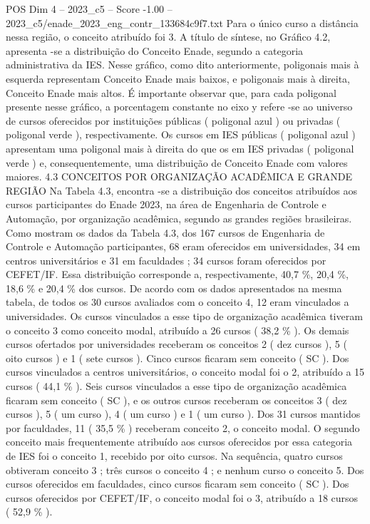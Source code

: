 \begin{textsample}{POS Dim 4 – 2023\_c5 – Score -1.00 – 2023\_c5/enade\_2023\_eng\_contr\_133684c9f7.txt}
Para o único curso a distância nessa região, o conceito atribuído foi 3.
A título de síntese, no Gráfico 4.2, apresenta -se a distribuição do Conceito Enade, segundo a categoria administrativa da IES.
Nesse gráfico, como dito anteriormente, poligonais mais à esquerda representam Conceito Enade mais baixos, e poligonais mais à direita, Conceito Enade mais altos.
É importante observar que, para cada poligonal presente nesse gráfico, a porcentagem constante no eixo y refere -se ao universo de cursos oferecidos por instituições públicas ( poligonal azul ) ou privadas ( poligonal verde ), respectivamente.
Os cursos em IES públicas ( poligonal azul ) apresentam uma poligonal mais à direita do que os em IES privadas ( poligonal verde ) e, consequentemente, uma distribuição de Conceito Enade com valores maiores. 4.3 CONCEITOS POR ORGANIZAÇÃO ACADÊMICA E GRANDE REGIÃO Na Tabela 4.3, encontra -se a distribuição dos conceitos atribuídos aos cursos participantes do Enade 2023, na área de Engenharia de Controle e Automação, por organização acadêmica, segundo as grandes regiões brasileiras.
Como mostram os dados da Tabela 4.3, dos 167 cursos de Engenharia de Controle e Automação participantes, 68 eram oferecidos em universidades, 34 em centros universitários e 31 em faculdades ; 34 cursos foram oferecidos por CEFET/IF.
Essa distribuição corresponde a, respectivamente, 40,7 \%, 20,4 \%, 18,6 \% e 20,4 \% dos cursos.
De acordo com os dados apresentados na mesma tabela, de todos os 30 cursos avaliados com o conceito 4, 12 eram vinculados a universidades.
Os cursos vinculados a esse tipo de organização acadêmica tiveram o conceito 3 como conceito modal, atribuído a 26 cursos ( 38,2 \% ).
Os demais cursos ofertados por universidades receberam os conceitos 2 ( dez cursos ), 5 ( oito cursos ) e 1 ( sete cursos ).
Cinco cursos ficaram sem conceito ( SC ).
Dos cursos vinculados a centros universitários, o conceito modal foi o 2, atribuído a 15 cursos ( 44,1 \% ).
Seis cursos vinculados a esse tipo de organização acadêmica ficaram sem conceito ( SC ), e os outros cursos receberam os conceitos 3 ( dez cursos ), 5 ( um curso ), 4 ( um curso ) e 1 ( um curso ).
Dos 31 cursos mantidos por faculdades, 11 ( 35,5 \% ) receberam conceito 2, o conceito modal.
O segundo conceito mais frequentemente atribuído aos cursos oferecidos por essa categoria de IES foi o conceito 1, recebido por oito cursos.
Na sequência, quatro cursos obtiveram conceito 3 ; três cursos o conceito 4 ; e nenhum curso o conceito 5.
Dos cursos oferecidos em faculdades, cinco cursos ficaram sem conceito ( SC ).
Dos cursos oferecidos por CEFET/IF, o conceito modal foi o 3, atribuído a 18 cursos ( 52,9 \% ).

\end{textsample}
